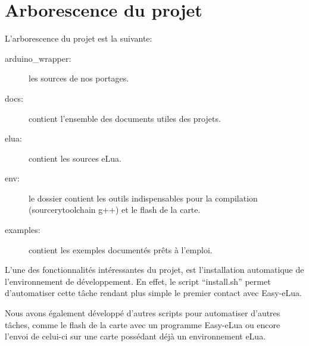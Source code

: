 \chapter[Arborescence du projet]{Arborescence du projet}
\label{chap:chap7}

L'arborescence du projet est la suivante:

\begin{description}
 \item[arduino\_wrapper: ] les sources de nos portages.
 \item[docs: ] contient l’ensemble des documents utiles des projets.
 \item[elua: ] contient les sources eLua.
 \item[env: ] le dossier contient les outils indispensables pour la compilation (sourcerytoolchain g++) et le flash de la carte.
 \item[examples: ] contient les exemples documentés prêts à l’emploi.
\end{description}
 
L’une des fonctionnalités intéressantes du projet, est l’installation automatique de l’environnement de développement. 
En effet, le script ``install.sh'' permet d’automatiser cette tâche rendant plus simple le premier contact avec Easy-eLua.

Nous avons également développé d’autres scripts pour automatiser d’autres tâches, comme le flash de la carte avec un programme 
Easy-eLua ou encore l’envoi de celui-ci sur une carte possédant déjà un environnement eLua.
